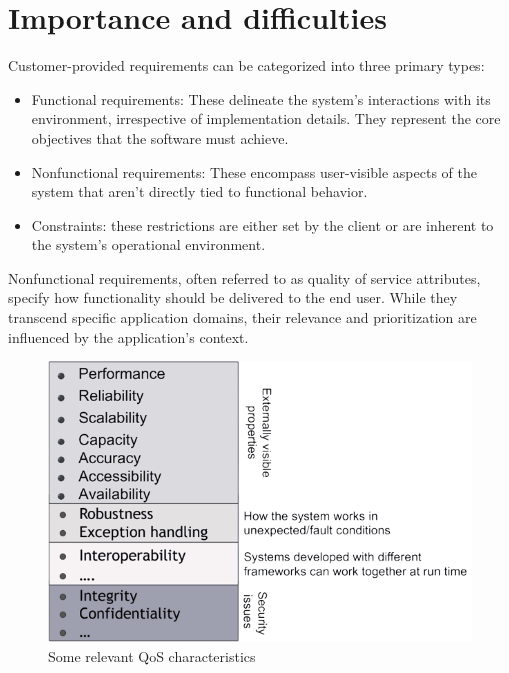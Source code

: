 \documentclass[12pt, a4paper]{report}
\begin{document}
    \section{Importance and difficulties}
    Customer-provided requirements can be categorized into three primary types:
    \begin{itemize}
        \item Functional requirements: These delineate the system's interactions with its environment, irrespective of implementation details. 
            They represent the core objectives that the software must achieve.
        \item Nonfunctional requirements: These encompass user-visible aspects of the system that aren't directly tied to functional behavior.
        \item Constraints: these restrictions are either set by the client or are inherent to the system's operational environment.
    \end{itemize}
    Nonfunctional requirements, often referred to as quality of service attributes, specify how functionality should be delivered to the end user. 
    While they transcend specific application domains, their relevance and prioritization are influenced by the application's context.
    \begin{figure}[H]
        \centering
        \includegraphics[width=0.5\linewidth]{images/QoS.png}
        \caption{Some relevant QoS characteristics}
    \end{figure}
\end{document}
